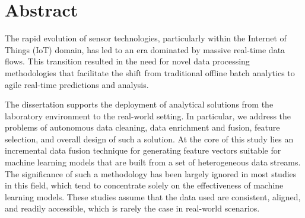 % 
\chapter*{Abstract}

The rapid evolution of sensor technologies, particularly within the Internet of Things (IoT) domain, has led to an era dominated by massive real-time data flows. 
This transition resulted in the need for novel data processing methodologies that facilitate the shift from traditional offline batch analytics to agile real-time predictions and analysis.

The dissertation supports the deployment of analytical solutions from the laboratory environment to the real-world setting.
In particular, we address the problems of autonomous data cleaning, data enrichment and fusion, feature selection, and overall design of such a solution.
At the core of this study lies an incremental data fusion technique for generating feature vectors suitable for machine learning models that are built from a set of heterogeneous data streams.
The significance of such a methodology has been largely ignored in most studies in this field, which tend to concentrate solely on the effectiveness of machine learning models.
These studies assume that the data used are consistent, aligned, and readily accessible, which is rarely the case in real-world scenarios.

